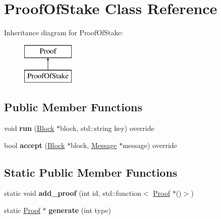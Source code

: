 \hypertarget{classProofOfStake}{}\section{Proof\+Of\+Stake Class Reference}
\label{classProofOfStake}
Inheritance diagram for Proof\+Of\+Stake\+:\begin{figure}[H]
\begin{center}
\leavevmode
\includegraphics[height=2.000000cm]{classProofOfStake}
\end{center}
\end{figure}
\subsection*{Public Member Functions}
\begin{DoxyCompactItemize}
\item 
\mbox{\label{classProofOfStake_aed9baba95df4aba7e8bd0a3e70c44945}} 
void {\bfseries run} (\mbox{\hyperlink{classBlock}{Block}} $\ast$block, std\+::string key) override
\item 
\mbox{\label{classProofOfStake_a7c5939106f9dcb8bc9612a5974a43c88}} 
bool {\bfseries accept} (\mbox{\hyperlink{classBlock}{Block}} $\ast$block, \mbox{\hyperlink{classMessage}{Message}} $\ast$message) override
\end{DoxyCompactItemize}
\subsection*{Static Public Member Functions}
\begin{DoxyCompactItemize}
\item 
\mbox{\label{classProof_a93208e5161d25f8533849ac2dac8d6b8}} 
static void {\bfseries add\+\_\+proof} (int id, std\+::function$<$ \mbox{\hyperlink{classProof}{Proof}} $\ast$()$>$)
\item 
\mbox{\label{classProof_a267f0f4587babb59884b5f280e2d54c8}} 
static \mbox{\hyperlink{classProof}{Proof}} $\ast$ {\bfseries generate} (int type)
\end{DoxyCompactItemize}

